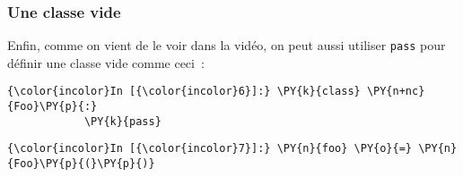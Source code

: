     \hypertarget{une-classe-vide}{%
\subsubsection{Une classe vide}\label{une-classe-vide}}

    Enfin, comme on vient de le voir dans la vidéo, on peut aussi utiliser
\texttt{pass} pour définir une classe vide comme ceci~:

    \begin{Verbatim}[commandchars=\\\{\}]
{\color{incolor}In [{\color{incolor}6}]:} \PY{k}{class} \PY{n+nc}{Foo}\PY{p}{:}
            \PY{k}{pass}
\end{Verbatim}


    \begin{Verbatim}[commandchars=\\\{\}]
{\color{incolor}In [{\color{incolor}7}]:} \PY{n}{foo} \PY{o}{=} \PY{n}{Foo}\PY{p}{(}\PY{p}{)}
\end{Verbatim}